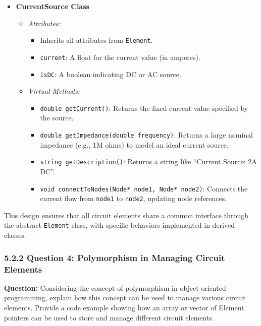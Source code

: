 \documentclass{article}
\begin{document}
\begin{enumerate}
\begin{itemize}
        \item \textbf{CurrentSource Class}
        \begin{itemize}
            \item \textit{Attributes:}
            \begin{itemize}
                \item Inherits all attributes from \texttt{Element}.
                \item \texttt{current}: A float for the current value (in amperes).
                \item \texttt{isDC}: A boolean indicating DC or AC source.
            \end{itemize}
            \item \textit{Virtual Methods:}
            \begin{itemize}
                \item \texttt{double getCurrent()}: Returns the fixed current value specified by the source.
                \item \texttt{double getImpedance(double frequency)}: Returns a large nominal impedance (e.g., 1M ohms) to model an ideal current source.
                \item \texttt{string getDescription()}: Returns a string like “Current Source: 2A DC”.
                \item \texttt{void connectToNodes(Node* node1, Node* node2)}: Connects the current flow from \texttt{node1} to \texttt{node2}, updating node references.
            \end{itemize}
        \end{itemize}
    \end{itemize}
\end{enumerate}

This design ensures that all circuit elements share a common interface through the abstract \texttt{Element} class, with specific behaviors implemented in derived classes.

\subsubsection*{5.2.2 Question 4: Polymorphism in Managing Circuit Elements}

\textbf{Question:} Considering the concept of polymorphism in object-oriented programming, explain how this concept can be used to manage various circuit elements. Provide a code example showing how an array or vector of Element pointers can be used to store and manage different circuit elements.
\end{document}
